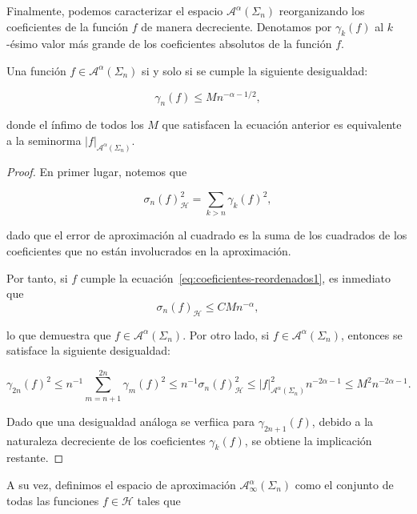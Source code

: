 Finalmente, podemos caracterizar el espacio $\mathcal{A}^{\alpha}(\Sigma_n)$ reorganizando los coeficientes de la función $f$ de manera decreciente. Denotamos por $\gamma_k(f)$ al $k$-ésimo valor más grande de los coeficientes absolutos de la función $f$. 

\begin{teorema}
    Una función $f \in \mathcal{A}^{\alpha}(\Sigma_n)$ si y solo si se cumple la siguiente desigualdad:

    \begin{equation}\label{eq:coeficientes-reordenados1}
        \gamma_n(f) \leq M n^{-\alpha - 1/2},
    \end{equation}

    donde el ínfimo de todos los $M$ que satisfacen la ecuación anterior es equivalente a la seminorma $|f|_{\mathcal{A}^{\alpha}(\Sigma_n)}$.
\end{teorema}

\begin{proof}
    En primer lugar, notemos que

    \[
        \sigma_n(f)^2_{\mathcal{H}} = \sum_{k>n} \gamma_k(f)^2,
    \]

    dado que el error de aproximación al cuadrado es la suma de los cuadrados de los coeficientes que no están involucrados en la aproximación.\newline

    Por tanto, si $f$ cumple la ecuación~\eqref{eq:coeficientes-reordenados1}, es inmediato que
    \[
        \sigma_n(f)_{\mathcal{H}} \leq C M n^{-\alpha},
    \]

    lo que demuestra que $f \in \mathcal{A}^{\alpha}(\Sigma_n)$. Por otro lado, si $f \in \mathcal{A}^{\alpha}(\Sigma_n)$, entonces se satisface la siguiente desigualdad:

    \[
        \gamma_{2n}(f)^2 \leq n^{-1} \sum_{m=n+1}^{2n} \gamma_m(f)^2 \leq n^{-1} \sigma_n(f)_{\mathcal{H}}^2 \leq |f|_{\mathcal{A}^{\alpha}(\Sigma_n)}^2 n^{-2\alpha - 1} \leq M^2 n^{-2\alpha - 1}.
    \]

    Dado que una desigualdad análoga se verfiica para $\gamma_{2n+1}(f)$, debido a la naturaleza decreciente de los coeficientes $\gamma_k(f)$, se obtiene la implicación restante.\newline
\end{proof}

A su vez, definimos el espacio de aproximación $\mathcal{A}_{\infty}^{\alpha}(\Sigma_n)$ como el conjunto de todas las funciones $f \in \mathcal{H}$ tales que

